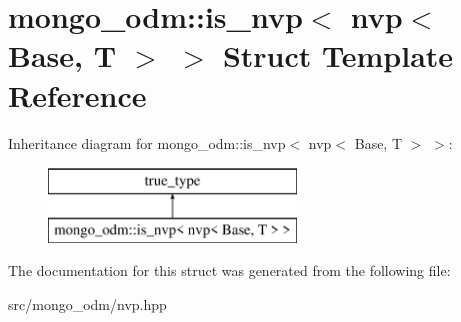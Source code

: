 \hypertarget{structmongo__odm_1_1is__nvp_3_01nvp_3_01Base_00_01T_01_4_01_4}{}\section{mongo\+\_\+odm\+:\+:is\+\_\+nvp$<$ nvp$<$ Base, T $>$ $>$ Struct Template Reference}
\label{structmongo__odm_1_1is__nvp_3_01nvp_3_01Base_00_01T_01_4_01_4}
Inheritance diagram for mongo\+\_\+odm\+:\+:is\+\_\+nvp$<$ nvp$<$ Base, T $>$ $>$\+:\begin{figure}[H]
\begin{center}
\leavevmode
\includegraphics[height=2.000000cm]{structmongo__odm_1_1is__nvp_3_01nvp_3_01Base_00_01T_01_4_01_4}
\end{center}
\end{figure}


The documentation for this struct was generated from the following file\+:\begin{DoxyCompactItemize}
\item 
src/mongo\+\_\+odm/nvp.\+hpp\end{DoxyCompactItemize}
